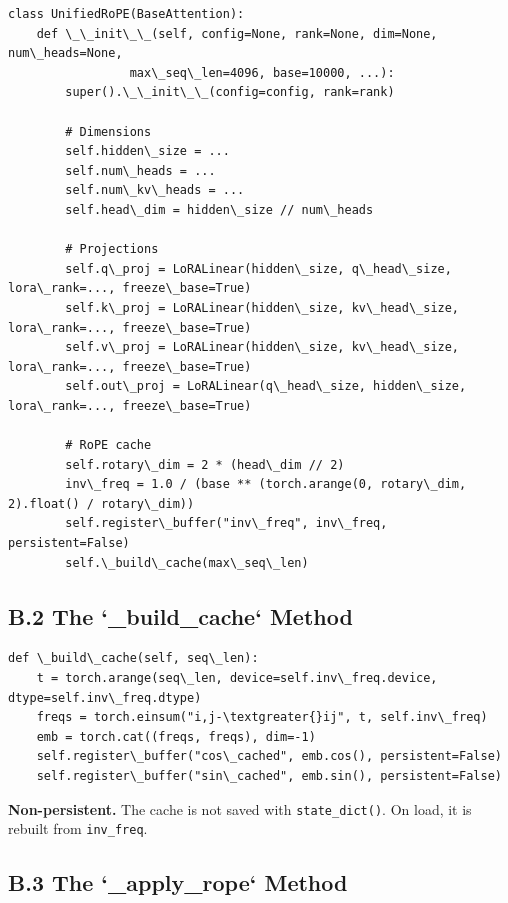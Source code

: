\begin{lstlisting}
class UnifiedRoPE(BaseAttention):
    def \_\_init\_\_(self, config=None, rank=None, dim=None, num\_heads=None,
                 max\_seq\_len=4096, base=10000, ...):
        super().\_\_init\_\_(config=config, rank=rank)
        
        # Dimensions
        self.hidden\_size = ...
        self.num\_heads = ...
        self.num\_kv\_heads = ...
        self.head\_dim = hidden\_size // num\_heads
        
        # Projections
        self.q\_proj = LoRALinear(hidden\_size, q\_head\_size, lora\_rank=..., freeze\_base=True)
        self.k\_proj = LoRALinear(hidden\_size, kv\_head\_size, lora\_rank=..., freeze\_base=True)
        self.v\_proj = LoRALinear(hidden\_size, kv\_head\_size, lora\_rank=..., freeze\_base=True)
        self.out\_proj = LoRALinear(q\_head\_size, hidden\_size, lora\_rank=..., freeze\_base=True)
        
        # RoPE cache
        self.rotary\_dim = 2 * (head\_dim // 2)
        inv\_freq = 1.0 / (base ** (torch.arange(0, rotary\_dim, 2).float() / rotary\_dim))
        self.register\_buffer("inv\_freq", inv\_freq, persistent=False)
        self.\_build\_cache(max\_seq\_len)
\end{lstlisting}

\subsection{B.2 The `\_build\_cache` Method}

\begin{lstlisting}
def \_build\_cache(self, seq\_len):
    t = torch.arange(seq\_len, device=self.inv\_freq.device, dtype=self.inv\_freq.dtype)
    freqs = torch.einsum("i,j-\textgreater{}ij", t, self.inv\_freq)
    emb = torch.cat((freqs, freqs), dim=-1)
    self.register\_buffer("cos\_cached", emb.cos(), persistent=False)
    self.register\_buffer("sin\_cached", emb.sin(), persistent=False)
\end{lstlisting}

\textbf{Non-persistent.} The cache is not saved with \texttt{state\_dict()}. On load, 
it is rebuilt from \texttt{inv\_freq}.

\subsection{B.3 The `\_apply\_rope` Method}

